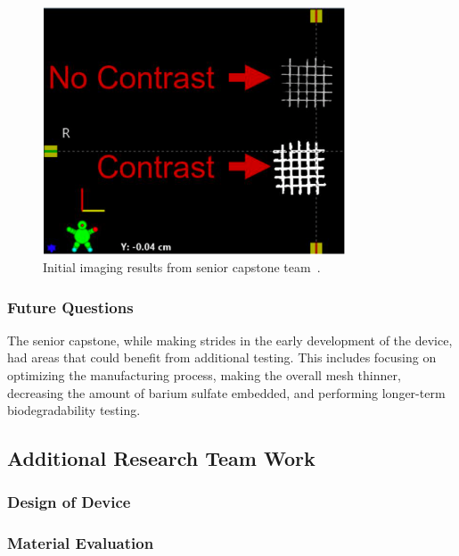 \begin{figure}[h!]
        \centering
        \includegraphics[width=0.8\textwidth]{../figs/introduction/capstone_imaging_testing.png}
        \caption{Initial imaging results from senior capstone team~\cite{RefWorks:RefID:372-krakovskytumor}.}
        \label{fig:introduction:capstoneImagingTesting}
\end{figure}

\subsubsection{Future Questions\label{sec:introduction:priorWork:seniorCapstone:futureQuestions}}

The senior capstone, while making strides in the early development of the device, had areas that could benefit from additional testing. This includes focusing on optimizing the manufacturing process, making the overall mesh thinner, decreasing the amount of barium sulfate embedded, and performing longer-term biodegradability testing.

\subsection{Additional Research Team Work\label{sec:introduction:priorWork:otherTeamWork}}

\subsubsection{Design of Device\label{sec:introduction:priorWork:otherTeamWork:deviceDesign}}

\subsubsection{Material Evaluation\label{sec:introduction:priorWork:otherTeamWork:materialEval}}

